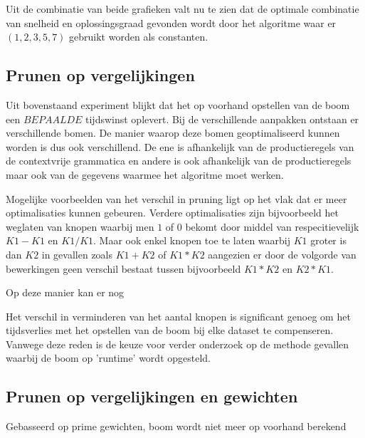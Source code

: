 \documentclass[Main.tex]{subfiles}
\begin{document}
Uit de combinatie van beide grafieken valt nu te zien dat de optimale combinatie van snelheid en oplossingsgraad gevonden wordt door het algoritme waar er $(1,2,3,5,7)$ gebruikt worden als constanten. 

\subsection{Prunen op vergelijkingen}

Uit bovenstaand experiment blijkt dat het op voorhand opstellen van de boom een $BEPAALDE$ tijdswinst oplevert. Bij de verschillende aanpakken ontstaan er verschillende bomen. De manier waarop deze bomen geoptimaliseerd kunnen worden is dus ook verschillend. De ene is afhankelijk van de productieregels van de contextvrije grammatica en andere is ook afhankelijk van de productieregels maar ook van de gegevens waarmee het algoritme moet werken. 
\par 
Mogelijke voorbeelden van het verschil in pruning ligt op het vlak dat er meer optimalisaties kunnen gebeuren. Verdere optimalisaties zijn bijvoorbeeld het weglaten van knopen waarbij men $1$ of $0$ bekomt door middel van respecitievelijk $K1-K1$ en $K1/K1$. Maar ook enkel knopen toe te laten waarbij $K1$ groter is dan $K2$ in gevallen zoals $K1+K2$ of $K1*K2$ aangezien er door de volgorde van bewerkingen geen verschil bestaat tussen bijvoorbeeld $K1*K2$ en $K2*K1$.
\par 
Op deze manier kan er nog %

Het verschil in verminderen van het aantal knopen is significant genoeg om het tijdsverlies met het opstellen van de boom bij elke dataset te compenseren. Vanwege deze reden is de keuze voor verder onderzoek op de methode gevallen waarbij de boom op 'runtime' wordt opgesteld. 

\subsection{Prunen op vergelijkingen en gewichten}
Gebasseerd op prime gewichten, boom wordt niet meer op voorhand berekend
\end{document}
